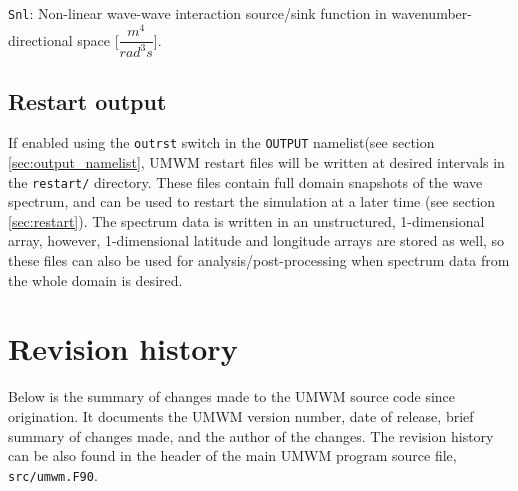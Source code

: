\documentclass[letterpaper]{article}
\numberwithin{equation}{section}
\begin{document}
\verb+Snl+:
Non-linear wave-wave interaction source/sink function in wavenumber-directional space [$\dfrac{m^{4}}{rad^{3}s}$].


\subsection{Restart output}

If enabled using the \verb+outrst+ switch in the 
\verb+OUTPUT+ namelist(see section \ref{sec:output_namelist},
UMWM restart files will be written at desired intervals 
in the \verb+restart/+ directory.
These files contain full domain snapshots of the wave spectrum,
and can be used to restart the simulation at a later time 
(see section \ref{sec:restart}).
The spectrum data is written in an unstructured, 1-dimensional array,
however, 1-dimensional latitude and longitude arrays are stored as well,
so these files can also be used for analysis/post-processing when spectrum
data from the whole domain is desired. 

\newpage
\section{Revision history}

Below is the summary of changes made to the UMWM source code since origination.
It documents the UMWM version number, date of release, brief summary of changes made,
and the author of the changes.
The revision history can be also found in the header of the main UMWM program 
source file, \verb+src/umwm.F90+.
\end{document}
